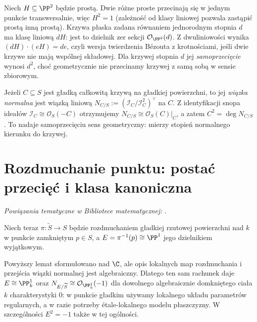\begin{przyklad}[Przecięcia w $\PP^2$]
\label{prz:ga6-p2}
Niech $H\subseteq\PP^2$ będzie prostą. Dwie różne proste
przecinają się w jednym punkcie transwersalnie,
więc $H^2=1$ (zależność od klasy liniowej pozwala zastąpić
prostą inną prostą). Krzywa płaska zadana równaniem jednorodnym
stopnia $d$ ma klasę liniową $dH$: jest to dzielnik zer
sekcji $\mathcal O_{\PP^2}(d)$. Z dwuliniowości wynika
$(dH)\cdot(eH)=de$, czyli wersja twierdzenia Bézouta
z krotnościami, jeśli dwie krzywe nie mają wspólnej składowej.
Dla krzywej stopnia $d$ jej \emph{samoprzecięcie} wynosi $d^2$,
choć geometrycznie nie przecinamy krzywej z samą sobą
w sensie zbiorowym.
\end{przyklad}

\begin{definicja}
Jeżeli $C\subseteq S$ jest gładką całkowitą krzywą
na gładkiej powierzchni, to jej \emph{wiązka normalna}
jest wiązką liniową
$N_{C/S}:=(\mathcal I_C/\mathcal I_C^2)^\vee$ na $C$.
Z identyfikacji snopa ideałów $\mathcal I_C\cong\mathcal O_S(-C)$
otrzymujemy $N_{C/S}\cong\mathcal O_S(C)|_C$, a zatem
$C^2=\deg N_{C/S}$. To nadaje samoprzecięciu sens
geometryczny: mierzy stopień normalnego kierunku do krzywej.
\end{definicja}

\section{Rozdmuchanie punktu: postać przecięć i klasa kanoniczna}
\label{sec:ga6-blowup}

\noindent\emph{Powiązania tematyczne w Bibliotece matematycznej:} .


Niech teraz $\pi:\widetilde S\to S$ będzie rozdmuchaniem
gładkiej rzutowej powierzchni nad $k$ w punkcie
zamkniętym $p\in S$,
a $E=\pi^{-1}(p)\cong\PP^1$ jego dzielnikiem wyjątkowym.



Powyższy lemat sformułowano nad $\C$, ale opis lokalnych map
rozdmuchania i przejścia wiązki normalnej jest algebraiczny.
Dlatego ten sam rachunek daje $E\cong\PP^1_k$ oraz
$N_{E/\widetilde S}\cong\mathcal O_{\PP^1_k}(-1)$
dla dowolnego algebraicznie domkniętego ciała $k$
charakterystyki $0$: w punkcie gładkim używamy
lokalnego układu parametrów regularnych, a w razie
potrzeby étale-lokalnego modelu płaszczyzny.
W szczególności $E^2=-1$ także w tej ogólności.

